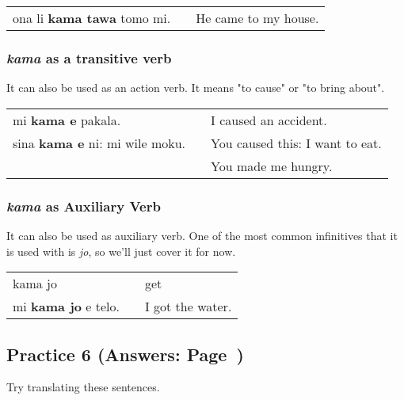 \begin{supertabular}{p{5,5cm}|ll}
ona li \textbf{kama tawa} tomo mi. && He came to my house. \\
\end{supertabular} 
%
\subsubsection*{\textit{kama} as a transitive verb}
%
It can also be used as an action verb. 
It means "to cause" or "to bring about".

\begin{supertabular}{p{5,5cm}|ll}
mi \textbf{kama e} pakala. && I caused an accident. \\
sina \textbf{kama e} ni: mi wile moku. && You caused this: I want to eat. \\ && You made me hungry. \\
\end{supertabular} 
%
\subsubsection*{\textit{kama} as Auxiliary Verb}
%
It can also be used as auxiliary verb. 
One of the most common infinitives that it is used with is \textit{jo}, so we'll just cover it for now. 

\begin{supertabular}{p{5,5cm}|ll}
kama jo && get \\
mi \textbf{kama jo} e telo. && I got the water. \\
\end{supertabular} 
%
\subsection*{Practice 6 (Answers: Page~\pageref{'prepositions01'})}
%
Try translating these sentences. 

